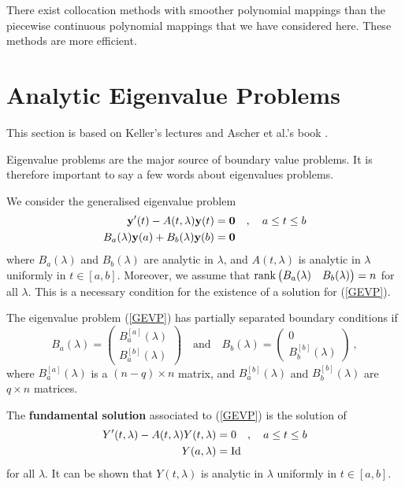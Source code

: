 \begin{rmk}
There exist collocation methods with smoother polynomial mappings than
the piecewise continuous polynomial mappings that we have considered
here.  These methods are more efficient.
\end{rmk}

\section{Analytic Eigenvalue Problems}

This section is based on Keller's lectures \cite{K} and Ascher et
al.'s book \cite{AMR}.

Eigenvalue problems are the major source of boundary value problems.
It is therefore important to say a few words about eigenvalues
problems.

We consider the generalised eigenvalue problem
\begin{equation}  \label{GEVP}
\begin{split}
\mathbf{y}'(t) - A(t,\lambda)\mathbf{y}(t) &= \mathbf{0}
\quad , \quad a \leq t \leq b\\
B_a(\lambda)\mathbf{y}(a) + B_b(\lambda)\mathbf{y}(b) &= \mathbf{0}
\end{split}
\end{equation}
where $B_a(\lambda)$ and $B_b(\lambda)$ are analytic in $\lambda$, and
$A(t,\lambda)$ is analytic in $\lambda$ uniformly in $t \in [a,b]$.
Moreover, we assume that
$\operatorname{rank} \begin{pmatrix} B_a(\lambda) & B_b(\lambda) \end{pmatrix}= n$ for
all $\lambda$.  This is a necessary condition for the existence of a
solution for (\ref{GEVP}).

\begin{rmk}
The eigenvalue problem (\ref{GEVP}) has partially separated boundary
conditions if
\[
B_a(\lambda) = \begin{pmatrix}
B_a^{[a]}(\lambda) \\ B_a^{[b]}(\lambda)
\end{pmatrix} \quad \text{and} \quad
B_b(\lambda) = \begin{pmatrix}
0 \\ B_b^{[b]}(\lambda)
\end{pmatrix} \ ,
\]
where $B_a^{[a]}(\lambda)$ is a $(n-q)\times n$ matrix, and
$B_a^{[b]}(\lambda)$ and $B_b^{[b]}(\lambda)$ are $q\times n$ matrices.
\label{PSBC_GEVP}
\end{rmk}

The {\bfseries fundamental solution} associated to (\ref{GEVP}) is the 
solution of
\[
\begin{split}
Y'(t,\lambda) - A(t,\lambda)Y(t,\lambda) &= 0
\quad , \quad a \leq t \leq b\\
Y(a,\lambda) &= \operatorname{Id}
\end{split}
\]
for all $\lambda$.  It can be shown that $Y(t,\lambda)$ is analytic
in $\lambda$ uniformly in $t \in [a,b]$.


